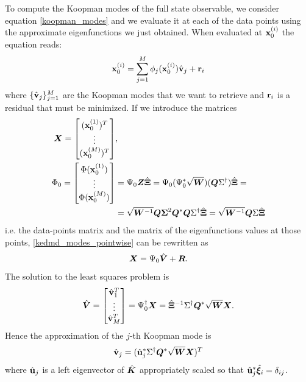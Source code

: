 To compute the Koopman modes of the full state observable, we consider equation \eqref{koopman_modes} and we evaluate it at each of the data points using the approximate eigenfunctions we just obtained. When evaluated at $\vb{x}_0^{(i)}$ the equation reads:
\begin{equation}
    \label{kedmd_modes_pointwise}
    \vb{x}_0^{(i)} = \sum_{j = 1}^M \phi_j(\vb{x}_0^{(i)})\hat{\vb{v}}_{j} + \vb{r}_i
\end{equation}
where $\{\hat{\vb{v}}_{j}\}_{j=1}^M$ are the Koopman modes that we want to retrieve and $\vb{r}_i$ is a residual that must be minimized. If we introduce the matrices
\begin{equation}
    \begin{split}
    \vb*{X} = 
    \begin{bmatrix}
    (\vb{x}_0^{(1)})^T \\
    \vdots \\
    (\vb{x}_0^{(M)})^T
    \end{bmatrix}&,
    \\ 
    \Phi_0 = 
    \begin{bmatrix}
    \Phi(\vb{x}_0^{(1)}) \\
    \vdots \\
    \Phi(\vb{x}_0^{(M)})
    \end{bmatrix}&
    = \Psi_0 \vb*{Z}\hat{\bm{\Xi}} = \Psi_0 (\Psi_0^*\sqrt{\vb*{W}})(\vb*{Q}\Sigma^{\dagger}) \hat{\bm{\Xi}} =\\
    & = \sqrt{\vb*{W}^{-1}} \vb*{Q}\vb*{\Sigma}^2\vb*{Q}^*\vb*{Q}\Sigma^{\dagger}\hat{\bm{\Xi}} = \sqrt{\vb*{W}^{-1}} \vb*{Q}\Sigma\hat{\bm{\Xi}}
    \end{split}
\end{equation}
i.e. the data-points matrix and the matrix of the eigenfunctions values at those points, \eqref{kedmd_modes_pointwise} can be rewritten as
\begin{equation}
    \label{kedmd_modes_matrix}
    \vb*{X} = \Psi_0 \hat{\vb*{V}} + \vb*{R}.
\end{equation}
The solution to the least squares problem is 
\begin{equation}
    \hat{\vb*{V}} =  
    \begin{bmatrix}
    \hat{\vb{v}}_1^T \\
    \vdots \\
    \hat{\vb{v}}_M^T
    \end{bmatrix}
    = \Psi_0^{\dagger} \vb*{X} = \hat{\bm{\Xi}}^{-1} \Sigma^{\dagger} \vb*{Q}^* \sqrt{\vb*{W}} \vb*{X}.
\end{equation}
Hence the approximation of the $j$-th Koopman mode is 
\begin{equation}
    \label{kedmd_modes}
    \hat{\vb{v}}_j = (\hat{\vb{u}}_j^* \Sigma^{\dagger} \vb*{Q}^* \sqrt{\vb*{W}} \vb*{X})^T
\end{equation}
where $\hat{\vb{u}}_j$ is a left eigenvector of $\hat{\vb*{K}}$ appropriately scaled so that $\hat{\vb{u}}_j^*\hat{\bm{\xi}}_i = \delta_{ij}$.

